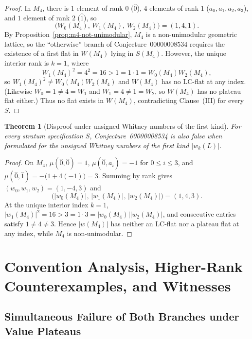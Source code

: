\documentclass[11pt]{article}
\newtheorem{theorem}{Theorem}[section]
\theoremstyle{definition}
\theoremstyle{remark}
\begin{document}
\begin{proof}
In $M_4$, there is $1$ element of rank $0$ ($\hat{0}$), $4$ elements of rank $1$
($a_0, a_1, a_2, a_3$), and $1$ element of rank $2$ ($\hat{1}$), so
\[
  \bigl(W_0(M_4),\, W_1(M_4),\, W_2(M_4)\bigr) = (1, 4, 1).
\]
By Proposition~\ref{prop:m4-not-unimodular}, $M_4$ is a non-unimodular geometric lattice, so the
``otherwise'' branch of Conjecture~00000008534 requires the existence of a first flat in
$W(M_4)$ lying in $S(M_4)$. However, the unique interior rank is $k = 1$, where
\[
  W_1(M_4)^2 = 4^2 = 16 > 1 = 1 \cdot 1 = W_0(M_4) W_2(M_4),
\]
so $W_1(M_4)^2 \neq W_0(M_4) W_2(M_4)$ and $W(M_4)$ has no LC-flat at any index. (Likewise
$W_0 = 1 \neq 4 = W_1$ and $W_1 = 4 \neq 1 = W_2$, so $W(M_4)$ has no plateau flat either.) Thus
no flat exists in $W(M_4)$, contradicting Clause~(III) for every $S$.
\end{proof}

\begin{theorem}[Disproof under unsigned Whitney numbers of the first kind]
\label{thm:disproof-W1}
For every stratum specification $S$, Conjecture~00000008534 is also false when formulated for the
unsigned Whitney numbers of the first kind $|w_k(L)|$.
\end{theorem}

\begin{proof}
On $M_4$, $\mu(\hat{0}, \hat{0}) = 1$, $\mu(\hat{0}, a_i) = -1$ for $0 \le i \le 3$, and
$\mu(\hat{0}, \hat{1}) = -\bigl(1 + 4(-1)\bigr) = 3$. Summing by rank gives
$(w_0, w_1, w_2) = (1, -4, 3)$ and
\[
  \bigl(|w_0(M_4)|,\, |w_1(M_4)|,\, |w_2(M_4)|\bigr) = (1, 4, 3).
\]
At the unique interior index $k = 1$, $|w_1(M_4)|^2 = 16 > 3 = 1 \cdot 3 = |w_0(M_4)||w_2(M_4)|$,
and consecutive entries satisfy $1 \neq 4 \neq 3$. Hence $|w(M_4)|$ has neither an LC-flat nor a
plateau flat at any index, while $M_4$ is non-unimodular.
\end{proof}

\section{Convention Analysis, Higher-Rank Counterexamples, and Witnesses}

\subsection{Simultaneous Failure of Both Branches under Value Plateaus}
\end{document}
